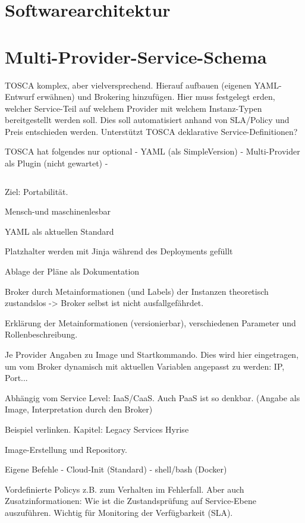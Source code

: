 
\section{Softwarearchitektur}


\section{Multi-Provider-Service-Schema}


TOSCA komplex, aber vielversprechend. Hierauf aufbauen (eigenen YAML-Entwurf erwähnen) und Brokering hinzufügen. Hier muss festgelegt erden, welcher Service-Teil auf welchem Provider mit welchem Instanz-Typen bereitgestellt werden soll. Dies soll automatisiert anhand von SLA/Policy und Preis entschieden werden. Unterstützt TOSCA deklarative Service-Definitionen?


TOSCA hat folgendes nur optional
- YAML (als SimpleVersion)
- Multi-Provider als Plugin (nicht gewartet)
- 

\inputminted[]{yaml}{../clouds.yaml}


Ziel: Portabilität.

Mensch-und maschinenlesbar

YAML als aktuellen Standard

Platzhalter werden mit Jinja während des Deployments gefüllt

Ablage der Pläne als Dokumentation

Broker durch Metainformationen (und Labels) der Instanzen theoretisch zustandslos -> Broker selbst ist nicht ausfallgefährdet.

Erklärung der Metainformationen (versionierbar), verschiedenen Parameter und Rollenbeschreibung.

Je Provider Angaben zu Image und Startkommando. Dies wird hier eingetragen, um vom Broker dynamisch mit aktuellen Variablen angepasst zu werden: IP, Port...

Abhängig vom Service Level: IaaS/CaaS. Auch PaaS ist so denkbar. (Angabe als Image, Interpretation durch den Broker)

Beispiel verlinken.
Kapitel: Legacy Services Hyrise

Image-Erstellung und Repository.

Eigene Befehle
- Cloud-Init (Standard)
- shell/bash (Docker)

Vordefinierte Policys z.B. zum Verhalten im Fehlerfall. Aber auch Zusatzinformationen: Wie ist die Zustandsprüfung auf Service-Ebene auszuführen. Wichtig für Monitoring der Verfügbarkeit (SLA).

